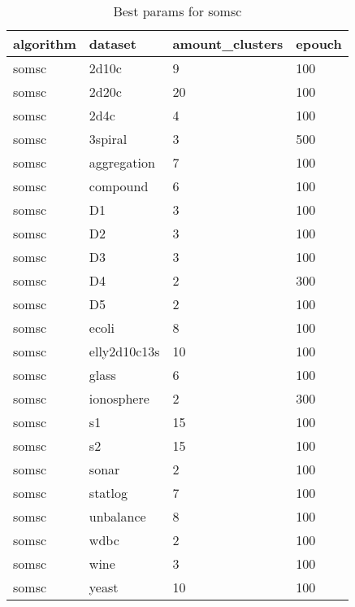 \begin{table}[H]
\centering
\caption{Best params for somsc}
\label{tab:params:somsc}
\begin{tabular}{|l|l|l|l|}
\hline
algorithm & dataset & amount\_clusters & epouch \\
\hline
somsc & 2d10c & 9 & 100 \\
\hline
somsc & 2d20c & 20 & 100 \\
\hline
somsc & 2d4c & 4 & 100 \\
\hline
somsc & 3spiral & 3 & 500 \\
\hline
somsc & aggregation & 7 & 100 \\
\hline
somsc & compound & 6 & 100 \\
\hline
somsc & D1 & 3 & 100 \\
\hline
somsc & D2 & 3 & 100 \\
\hline
somsc & D3 & 3 & 100 \\
\hline
somsc & D4 & 2 & 300 \\
\hline
somsc & D5 & 2 & 100 \\
\hline
somsc & ecoli & 8 & 100 \\
\hline
somsc & elly2d10c13s & 10 & 100 \\
\hline
somsc & glass & 6 & 100 \\
\hline
somsc & ionosphere & 2 & 300 \\
\hline
somsc & s1 & 15 & 100 \\
\hline
somsc & s2 & 15 & 100 \\
\hline
somsc & sonar & 2 & 100 \\
\hline
somsc & statlog & 7 & 100 \\
\hline
somsc & unbalance & 8 & 100 \\
\hline
somsc & wdbc & 2 & 100 \\
\hline
somsc & wine & 3 & 100 \\
\hline
somsc & yeast & 10 & 100 \\
\hline
\end{tabular}
\end{table}